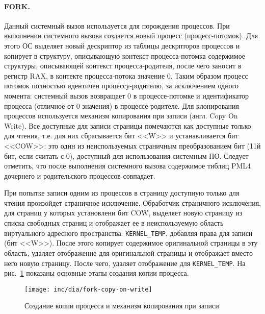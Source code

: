 \paragraph{FORK.} Данный системный вызов используется для порождения процессов. При выполнении системного
вызова создается новый процесс (процесс-потомок). Для этого ОС выделяет новый дескриптор из таблицы
дескрпторов процессов и копирует в структуру, описывающую контекст процесса-потомка содержимое структуры,
описывающей контекст процесса-родителя, после чего заносит в регистр RAX, в контекте процесса-потока значение 0.
Таким образом процесс потомок полностью идентичен процессу-родителю, за исключением одного момента: системный вызов
возвращает 0 в процессе-потомке и идентификатор процесса (отличное от 0 значения) в процессе-родителе. Для
клонирования процессов используется механизм копирования при записи (англ. Copy On Write). Все доступные для записи
страницы помечаются как доступные только для чтения, т.е. для них сбрасывается бит <<W>> и устанавливается бит <<COW>>:
это один из неиспользуемых страничным преобразованием бит (11й бит, если считать с 0), доступный для использования
системным ПО. Следует отметить, что после выполнения системного вызова содержимое тиблиц PML4 дочернего и родительского
процессов совпадает.

При попытке записи одним из процессов в страницу доступную только для чтения произойдет страничное исключение.
Обработчик страничного исключения, для страниц у которых установлени бит COW, выделяет новую страницу из списка
свободных страниц и отображает ее в неиспользуемую область виртуального адресного пространства: \texttt{KERNEL\_TEMP},
добавляя права для записи (бит <<W>>). После этого копирует содержимое оригинальной страницы в эту область, удаляет
отображение для оригинальной страницы и отображает вместо него новую страницу. После чего, удаляет отображение для
\texttt{KERNEL\_TEMP}. На рис.~\ref{fig:fork-copy-on-write} показаны основные этапы создания копии процесса.

\begin{figure}[ht!]
  \centering
  \texttt{[image: inc/dia/fork-copy-on-write]}
  \caption{Создание копии процесса и механизм копирования при записи}
  \label{fig:fork-copy-on-write}
\end{figure}

